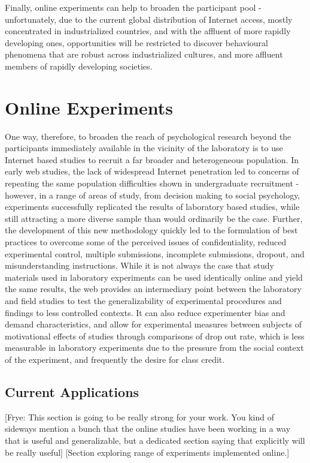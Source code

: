 \documentclass[12pt,a4paper,titlepage]{scrreprt}
\begin{document}
Finally, online experiments can help to broaden the participant pool\cite{gosling_wired_2010} - unfortunately, due to the current global distribution of Internet access, mostly concentrated in industrialized countries, and with the affluent of more rapidly developing ones, opportunities will be restricted to discover behavioural phenomena that are robust across industrialized cultures, and more affluent members of rapidly developing societies.
\section{Online Experiments}
One way, therefore, to broaden the reach of psychological research beyond the participants immediately available in the vicinity of the laboratory is to use Internet based studies to recruit a far broader and heterogeneous population. In early web studies, the lack of widespread Internet penetration led to concerns of repeating the same population difficulties shown in undergraduate recruitment - however, in a range of areas of study, from decision making to social psychology, experiments successfully replicated the results of laboratory based studies, while still attracting a more diverse sample than would ordinarily be the case\cite{krantz_comparing_1997,buchanan_using_1999,birnbaum_decision_2000,mcgraw_integrity_2000,gosling_should_2004,ritter_internet_2004}. Further, the development of this new methodology quickly led to the formulation of best practices to overcome some of the perceived issues of confidentiality, reduced experimental control, multiple submissions, incomplete submissions, dropout, and misunderstanding instructions\cite{reips_web_2000,reips_standards_2002,birnbaum_human_2004}. While it is not always the case that study materials used in laboratory experiments can be used identically online and yield the same results\cite{buchanan_nonequivalence_2005}, the web provides an intermediary point between the laboratory and field studies to test the generalizability of experimental procedures and findings to less controlled contexts. It can also reduce experimenter bias and demand characteristics, and allow for experimental measures between subjects of motivational effects of studies through comparisons of drop out rate\cite{reips_web_2000}, which is less measurable in laboratory experiments due to the pressure from the social context of the experiment, and frequently the desire for class credit.
\subsection{Current Applications}
[Frye: This section is going to be really strong for your work. You kind of sideways mention a bunch that the online studies have been working in a way that is useful and generalizable, but a dedicated section saying that explicitly will be really useful]
[Section exploring range of experiments implemented online.]
\end{document}

